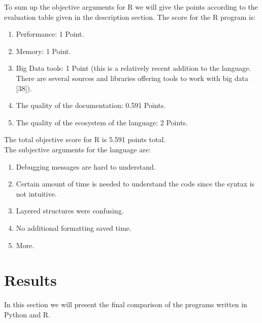 \documentclass[
  twoside,
  11pt, a4paper,
  footinclude=true,
  headinclude=true,
  cleardoublepage=empty
]{scrreprt}
\begin{document}
    To sum up the objective arguments for R we will give the points according to the evaluation table given in the description section. The score for the R program is:
    \begin{enumerate}
        \item Performance: 1 Point.
        \item Memory: 1 Point.
        \item Big Data tools: 1 Point (this is a relatively recent addition to the language. There are several sources and libraries offering tools to work with big data [38]).
        \item The quality of the documentation: 0.591 Points.
        \item The quality of the ecosystem of the language: 2 Points.
    \end{enumerate} 
    The total objective score for R is 5.591 points total.\\
    The subjective arguments for the language are:
    \begin{enumerate}
        \item Debugging messages are hard to understand.
        \item Certain amount of time is needed to understand the code since the syntax is not intuitive.
        \item Layered structures were confusing.
        \item No additional formatting saved time.
        \item More.
    \end{enumerate}
    
    \chapter{Results}
    In this section we will present the final comparison of the programs written in Python and R.
\end{document}
